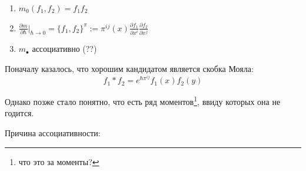 \documentclass[11pt]{article}
\def\p{\partial}
\theoremstyle{remark}
\theoremstyle{definition}
\newcommand{\que}[1]{\footnote{\textcolor[rgb]{0.38,0.69,0.82}{#1}}}
\begin{document}
\begin{enumerate}
  \item $m_0 (f_1, f_2) = f_1 f_2$
  \item $\frac{\partial m}{\partial \hbar}\Bigg|_{\hbar \to 0} = \{ f_1, f_2\}^{\pi} := \pi^{ij} (x) \frac{\p f_1}{\p x^i} \frac{\p f_2}{\p x^j}$
  \item $m_{\bullet}$ ассоциативно (??)
\end{enumerate}

Поначалу казалось, что хорошим кандидатом является скобка Мояла: $$f_1 * f_2 = e^{\hbar \pi^{ij} } f_1 (x) f_2 (y)$$

Однако позже стало понятно, что есть ряд моментов\que{что это за моменты?}, ввиду которых она не годится.


Причина ассоциативности:
\end{document}

